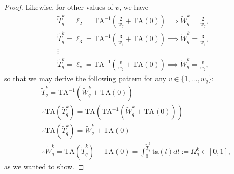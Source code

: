 \documentclass[hidelinks, nonatbib]{elsarticle}
\begin{document}
\begin{corollary}
\begin{proof}
        Likewise, for other values of $v$, we have
        \begin{gather}
            \tilde{T}_{q}^{k}
            =
            \ell_2
            =
            \text{TA}^{-1}
            \left(
                \frac{2}{w_q}
                +
                \text{TA}(0)
            \right)
            \implies
            \tilde{W}_{q}^{k}
            =
            \frac{2}{w_q}
            ,
            \\
            \tilde{T}_{q}^{k}
            =
            \ell_3
            =
            \text{TA}^{-1}
            \left(
                \frac{3}{w_q}
                +
                \text{TA}(0)
            \right)
            \implies
            \tilde{W}_{q}^{k}
            =
            \frac{3}{w_q}
            ,
            \\
            \vdots
            \\
            \tilde{T}_{q}^{k}
            =
            \ell_{v}
            =
            \text{TA}^{-1}
            \left(
                \frac{v}{w_q}
                +
                \text{TA}(0)
            \right)
            \implies
            \tilde{W}_{q}^{k}
            =
            \frac{v}{w_q}
            ,
        \end{gather}
        so that we may derive the following pattern for any $v \in \{1, \dots, w_q\}$:
        \begin{align}
            &\tilde{T}_{q}^{k}
            =
            \text{TA}^{-1}
            \left(
                \tilde{W}_{q}^{k}
                +
                \text{TA}(0)
            \right)
            \\
            &
            \therefore
            \text{TA}
            (
                \tilde{T}_{q}^{k}
            )
            =
            \text{TA}
            \left(
                \text{TA}^{-1}
                \left(
                    \tilde{W}_{q}^{k}
                    +
                    \text{TA}(0)
                \right)
            \right)
            \\
            &
            \therefore
            \text{TA}
            (
                \tilde{T}_{q}^{k}
            )
            =
            \tilde{W}_{q}^{k}
            +
            \text{TA}(0)
            \\
            &
            \therefore
            \tilde{W}_{q}^{k}
            =
            \text{TA}
            (
                \tilde{T}_{q}^{k}
            )
            -
            \text{TA}(0)
            =
            \int_{0}^{\tilde{T}_{q}^{k}}
            \text{ta}(l)
            dl
            :=
            \Omega_{q}^{k}
            \in 
            [0,1]
            ,
        \end{align}
        as we wanted to show.
        

\end{proof}
\end{corollary}
\end{document}
